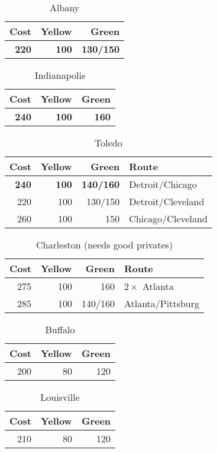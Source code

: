 \documentclass[a4paper,twocolumn]{article}
\begin{document}
\begin{table}[h]
	\centering
	\caption{Albany}
	\begin{tabular}{r|r|r}
		Cost & Yellow & Green \\ \hline
		\textbf{220} & \textbf{100} & \textbf{130/150}
	\end{tabular}
\end{table}

\begin{table}[h]
	\centering
	\caption{Indianapolis}
	\begin{tabular}{r|r|r}
		Cost & Yellow & Green \\ \hline
		\textbf{240} & \textbf{100} & \textbf{160}
	\end{tabular}
\end{table}

\begin{table}[h]
	\centering
	\caption{Toledo}
	\begin{tabular}{r|r|r|l}
		Cost & Yellow & Green & Route \\ \hline
		\textbf{240} & \textbf{100} & \textbf{140/160} & Detroit/Chicago \\
		220 & 100 & 130/150 & Detroit/Cleveland \\
		260 & 100 & 150 & Chicago/Cleveland \\
	\end{tabular}
\end{table}

\begin{table}[h]
	\centering
	\caption{Charleston (needs good privates)}
	\begin{tabular}{r|r|r|l}
		Cost & Yellow & Green & Route \\ \hline
		275 & 100 & 160 & $2 \times$ Atlanta \\
		285 & 100 & 140/160 & Atlanta/Pittsburg
	\end{tabular}
\end{table}

\begin{table}[h]
	\centering
	\caption{Buffalo}
	\begin{tabular}{r|r|r}
		Cost & Yellow & Green \\ \hline
		200 & 80 & 120
	\end{tabular}
\end{table}

\begin{table}[h]
	\centering
	\caption{Louisville}
	\begin{tabular}{r|r|r}
		Cost & Yellow & Green \\ \hline
		210 & 80 & 120
	\end{tabular}
\end{table}
\end{document}
